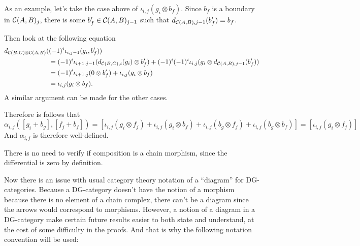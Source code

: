 \begin{remark}
\begin{enumerate}
{            As an example, let's take the case above of \( \iota_{i, j}(g_i \otimes b_f) \). Since \( b_f \) is a boundary in \( {\mathcal{C}}(A, B)_j \), there is some \( b_f' \in {\mathcal{C}}(A, B)_{j - 1} \) such that \( d_{{\mathcal{C}}(A, B), j - 1}(b_f') = b_f \).

            Then look at the following equation
            \begin{align*}
                d_{{\mathcal{C}}(B, C) \otimes {\mathcal{C}}(A, B)}(&(-1)^i \iota_{i, j - 1}(g_i, b_f')) \\
                &= (-1)^i \iota_{i + 1, j - 1}(d_{{\mathcal{C}}(B, C), i}(g_i) \otimes b_f') + (-1)^i(-1)^i\iota_{i, j}(g_i \otimes d_{{\mathcal{C}}(A, B), j - 1}(b_f')) \\
                &= (-1)^i \iota_{i + 1, j}(0 \otimes b_f') + \iota_{i, j}(g_i \otimes b_f) \\
                &= \iota_{i, j}(g_i \otimes b_f).
            \end{align*}
            A similar argument can be made for the other cases.

            Therefore is follows that
            \[
                \alpha_{i, j}([g_i + b_g], [f_j + b_f]) = [\iota_{i, j}(g_i \otimes f_j) + \iota_{i, j}(g_i \otimes b_f) + \iota_{i, j}(b_g \otimes f_j) + \iota_ {i, j}(b_g \otimes b_f)] = [\iota_{i, j}(g_i \otimes f_j)]
            \]
            And \( \alpha_{i, j} \) is therefore well-defined.
        }
    \end{enumerate}
    There is no need to verify if composition is a chain morphism, since the differential is zero by definition.
\end{remark}
\begin{remark}
    \label{rem:diagram_dg-category}
    Now there is an issue with usual category theory notation of a ``diagram'' for DG-categories. Because a DG-category doesn't have the notion of a morphism because there is no element of a chain complex, there can't be a diagram since the arrows would correspond to morphisms. However, a notion of a diagram in a DG-category make certain future results easier to both state and understand, at the cost of some difficulty in the proofs. And that is why the following notation convention will be used:
\end{remark}
